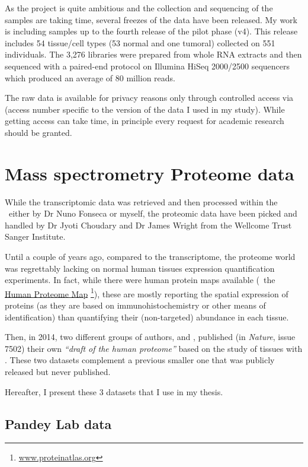 As the project is quite ambitious and the collection and sequencing of the samples
are taking time, several freezes of the data have been released. My work is
including samples up to the fourth release of the pilot phase (v4). This
release includes 54 tissue/cell types (53 normal and one tumoral)
collected on 551 individuals.
The 3,276 libraries were prepared from whole \gls{RNA} extracts and then sequenced
with a paired-end protocol on Illumina HiSeq 2000/2500 sequencers which produced
an average of 80 million reads.

The raw data is available for privacy reasons only through controlled access via
 (access number specific to the version of the data I used
in my study). While getting access can take time, in principle every request for
academic research should be granted.

\section{Mass spectrometry Proteome data}

While the transcriptomic data was retrieved and then processed within the \EBI\
either by Dr Nuno Fonseca or myself, the proteomic data have been picked and
handled by Dr Jyoti Choudary and Dr James Wright from the Wellcome Trust
Sanger Institute.

Until a couple of years ago, compared to the transcriptome, the proteome world
was regrettably lacking on normal human tissues expression quantification
experiments. In fact, while there were human protein maps available
(\eg\ the \href{www.proteinatlas}{Human Proteome Map}%
\footnote{\href{http://www.proteinatlas.org}{www.proteinatlas.org}}), these
are mostly reporting the spatial expression of proteins (as they are based
on immunohistochemistry or other means of identification) than quantifying
their (non-targeted) abundance in each tissue.

Then, in 2014, two different groups of authors, \cite{PandeyData}
and \cite{KusterData}, published (in \textit{Nature},
issue 7502) their own \emph{``draft of the human proteome''}
based on the study of tissues with \ms. These two datasets complement a previous
smaller one that was publicly released but never published.

Hereafter, I present these 3 datasets that I use in my thesis.

\subsection{Pandey Lab data}

